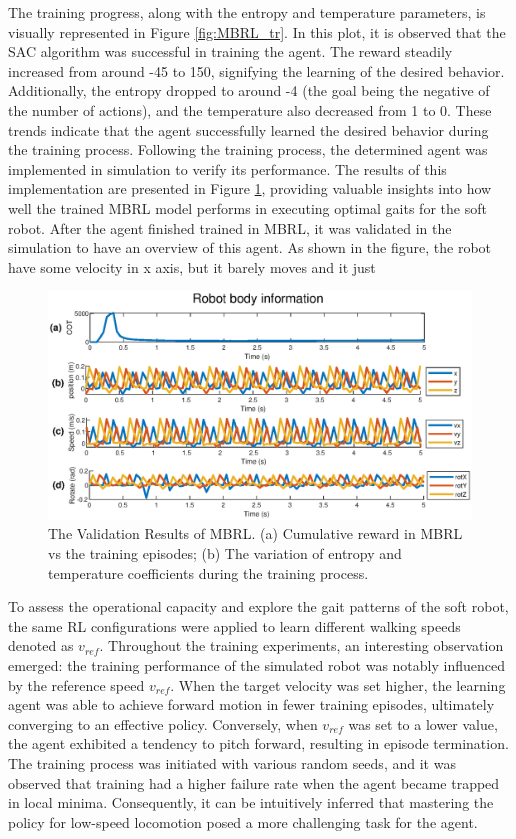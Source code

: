 The training progress, along with the entropy and temperature parameters, is visually represented in Figure \ref{fig:MBRL_tr}. In this plot, it is observed that the SAC algorithm was successful in training the agent. The reward steadily increased from around -45 to 150, signifying the learning of the desired behavior. Additionally, the entropy dropped to around -4 (the goal being the negative of the number of actions), and the temperature also decreased from 1 to 0. These trends indicate that the agent successfully learned the desired behavior during the training process. Following the training process, the determined agent was implemented in simulation to verify its performance. The results of this implementation are presented in Figure \ref{fig:MBRL_val}, providing valuable insights into how well the trained MBRL model performs in executing optimal gaits for the soft robot. After the agent finished trained in MBRL, it was validated in the simulation to have an overview of this agent. As shown in the figure, the robot have some velocity in x axis, but it barely moves and it just 
\begin{figure}[htb]
    \centering
    \includegraphics[width=\linewidth]{img/chap5/MBRL_val.eps}
    \caption{The Validation Results of MBRL. (a) Cumulative reward in MBRL vs the training episodes; (b) The variation of entropy and temperature coefficients during the training process.}
    \label{fig:MBRL_val}
\end{figure}

To assess the operational capacity and explore the gait patterns of the soft robot, the same RL configurations were applied to learn different walking speeds denoted as $v_{ref}$. Throughout the training experiments, an interesting observation emerged: the training performance of the simulated robot was notably influenced by the reference speed $v_{ref}$. When the target velocity was set higher, the learning agent was able to achieve forward motion in fewer training episodes, ultimately converging to an effective policy. Conversely, when $v_{ref}$ was set to a lower value, the agent exhibited a tendency to pitch forward, resulting in episode termination. The training process was initiated with various random seeds, and it was observed that training had a higher failure rate when the agent became trapped in local minima. Consequently, it can be intuitively inferred that mastering the policy for low-speed locomotion posed a more challenging task for the agent.

